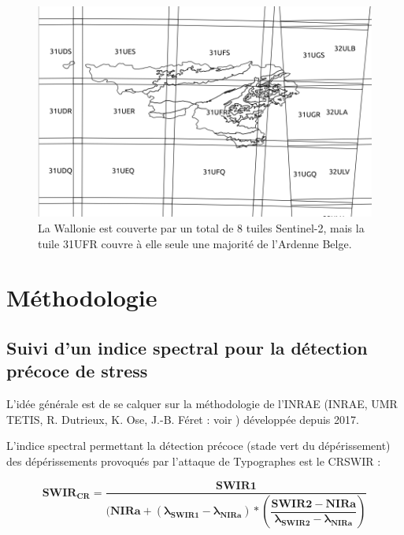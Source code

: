 \documentclass[a4paper, 12pt]{article} %
\begin{document}
\begin{figure}[H]
\centering
\includegraphics[width=0.9\linewidth]{../theia_d/tuileS2Nom.png}
\caption{La Wallonie est couverte par un total de 8 tuiles Sentinel-2, mais la tuile 31UFR couvre à elle seule une majorité de l'Ardenne Belge.}
\label{fig:tuileRW}
\end{figure}

\section{Méthodologie}

\subsection{Suivi d'un indice spectral pour la détection précoce de stress}\label{subsec:methodo}


L'idée générale est de se calquer sur la méthodologie de l'INRAE (INRAE, UMR TETIS, R. Dutrieux, K. Ose, J.-B. Féret : voir \cite{dutrieux_package_2021,dutrieux_mise_2021}) développée depuis 2017. 

L'indice spectral permettant la détection précoce (stade vert du dépérissement) des dépérissements provoqués par l'attaque de Typographes est le CRSWIR :

\begin{equation*}
\mathbold{SWIR_{CR} = \dfrac{SWIR1}{( NIRa + (\lambda_{SWIR1}-\lambda_{NIRa})* (\dfrac{SWIR2 - NIRa}{\lambda_{SWIR2}-\lambda_{NIRa}})}} %
\end{equation*}
\end{document}
